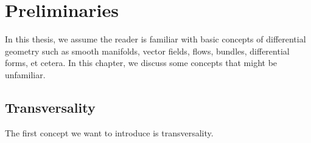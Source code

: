 \setcounter{chapter}{-1}
\chapter{Preliminaries}

In this thesis, we assume the reader is familiar with basic concepts of differential geometry such as smooth manifolds, vector fields, flows, bundles, differential forms, et cetera.
In this chapter, we discuss some concepts that might be unfamiliar.

\section*{Transversality}
The first concept we want to introduce is transversality.



